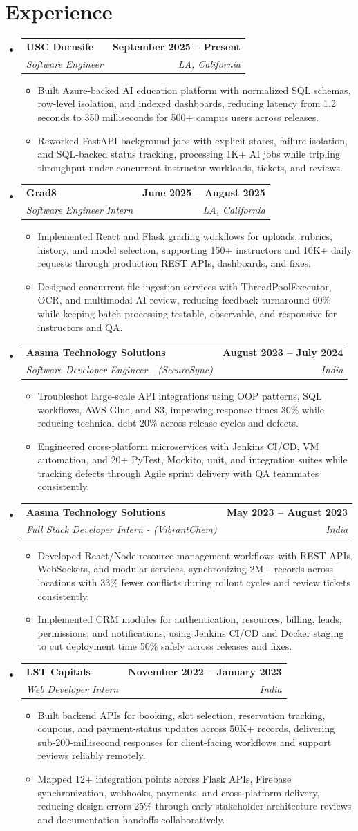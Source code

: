 \documentclass[letterpaper,10pt]{article}
\makeatletter
\newcommand{\itemTail}{\vspace{-4pt}}
\newcommand{\sectionGap}{\vspace{-8pt}}
\newcommand{\roleGap}{\vspace{0pt}}
\newcommand{\resumeItem}[1]{\item\small{{#1 \itemTail}}}
\newcommand{\resumeSubheading}[4]{\vspace{-1pt}\item\begin{tabular*}{1.0\textwidth}[t]{l@{\extracolsep{\fill}}r}\textbf{#1} & \textbf{\small #2} \\\textit{\small#3} & \textit{\small #4} \\\end{tabular*}\vspace{-2pt}}
\newcommand{\resumeSubHeadingListStart}{\begin{itemize}[leftmargin=0.0in, label={}]}
\newcommand{\resumeSubHeadingListEnd}{\end{itemize}}
\newcommand{\resumeItemListStart}{\begin{itemize}[leftmargin=0.15in,label=\textbullet,itemsep=4pt,topsep=0pt,parsep=0pt,partopsep=0pt]}
\newcommand{\resumeItemListEnd}{\end{itemize}\vspace{-4pt}}
\makeatother
\begin{document}
\section{Experience}
\resumeSubHeadingListStart
\resumeSubheading{USC Dornsife}{September 2025 -- Present}{Software Engineer}{LA, California}
\resumeItemListStart
\resumeItem{Built Azure-backed AI education platform with normalized SQL schemas, row-level isolation, and indexed dashboards, reducing latency from 1.2 seconds to 350 milliseconds for 500+ campus users across releases.}
\resumeItem{Reworked FastAPI background jobs with explicit states, failure isolation, and SQL-backed status tracking, processing 1K+ AI jobs while tripling throughput under concurrent instructor workloads, tickets, and reviews.}
\resumeItemListEnd
\roleGap
\resumeSubheading{Grad8}{June 2025 -- August 2025}{Software Engineer Intern}{LA, California}
\resumeItemListStart
\resumeItem{Implemented React and Flask grading workflows for uploads, rubrics, history, and model selection, supporting 150+ instructors and 10K+ daily requests through production REST APIs, dashboards, and fixes.}
\resumeItem{Designed concurrent file-ingestion services with ThreadPoolExecutor, OCR, and multimodal AI review, reducing feedback turnaround 60\% while keeping batch processing testable, observable, and responsive for instructors and QA.}
\resumeItemListEnd
\roleGap
\resumeSubheading{Aasma Technology Solutions}{August 2023 -- July 2024}{Software Developer Engineer - (SecureSync)}{India}
\resumeItemListStart
\resumeItem{Troubleshot large-scale API integrations using OOP patterns, SQL workflows, AWS Glue, and S3, improving response times 30\% while reducing technical debt 20\% across release cycles and defects.}
\resumeItem{Engineered cross-platform microservices with Jenkins CI/CD, VM automation, and 20+ PyTest, Mockito, unit, and integration suites while tracking defects through Agile sprint delivery with QA teammates consistently.}
\resumeItemListEnd
\roleGap
\resumeSubheading{Aasma Technology Solutions}{May 2023 -- August 2023}{Full Stack Developer Intern - (VibrantChem)}{India}
\resumeItemListStart
\resumeItem{Developed React/Node resource-management workflows with REST APIs, WebSockets, and modular services, synchronizing 2M+ records across locations with 33\% fewer conflicts during rollout cycles and review tickets consistently.}
\resumeItem{Implemented CRM modules for authentication, resources, billing, leads, permissions, and notifications, using Jenkins CI/CD and Docker staging to cut deployment time 50\% safely across releases and fixes.}
\resumeItemListEnd
\roleGap
\resumeSubheading{LST Capitals}{November 2022 -- January 2023}{Web Developer Intern}{India}
\resumeItemListStart
\resumeItem{Built backend APIs for booking, slot selection, reservation tracking, coupons, and payment-status updates across 50K+ records, delivering sub-200-millisecond responses for client-facing workflows and support reviews reliably remotely.}
\resumeItem{Mapped 12+ integration points across Flask APIs, Firebase synchronization, webhooks, payments, and cross-platform delivery, reducing design errors 25\% through early stakeholder architecture reviews and documentation handoffs collaboratively.}
\resumeItemListEnd
\resumeSubHeadingListEnd
\sectionGap
\end{document}
